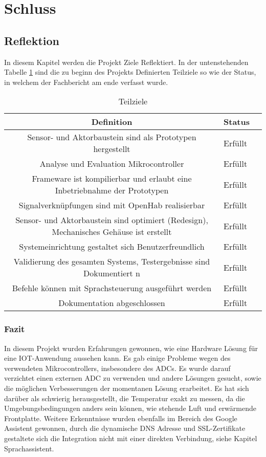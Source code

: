 \section{Schluss}

\subsection{Reflektion}

In diesem Kapitel werden die Projekt Ziele Reflektiert. In der untenstehenden Tabelle \ref{tab: Teilziele} sind die zu beginn des Projekts Definierten Teilziele so wie der Status, in welchem der Fachbericht am ende verfasst wurde.
\begin{table}[h!]
	\small
	\begin{tabular}{|c|l|c|}
		\hline 
		Definition & Status \\ 
		\hline 
		Sensor- und Aktorbaustein sind als Prototypen hergestellt& Erfüllt \\ 
		\hline 
		Analyse und Evaluation Mikrocontroller & Erfüllt \\ 
		\hline 
		Frameware ist kompilierbar und erlaubt eine Inbetriebnahme der Prototypen & Erfüllt \\ 
		\hline 
		Signalverknüpfungen sind mit OpenHab realisierbar & Erfüllt \\ 
		\hline 
		Sensor- und Aktorbaustein sind optimiert (Redesign), Mechanisches Gehäuse ist erstellt  & Erfüllt \\ 
		\hline 
		Systemeinrichtung gestaltet sich Benutzerfreundlich & Erfüllt \\ 
		\hline 
		Validierung des gesamten Systems, Testergebnisse sind Dokumentiert n & Erfüllt \\ 
		\hline 
		Befehle können mit Sprachsteuerung ausgeführt werden & Erfüllt \\ 
		\hline 
		Dokumentation abgeschlossen & Erfüllt \\ 
		\hline 
		\end{tabular}
	\caption{Teilziele}
	\label{tab: Teilziele}	 
\end{table}



\subsubsection{Fazit}
 In diesem Projekt wurden Erfahrungen gewonnen, wie eine Hardware Lösung für eine IOT-Anwendung aussehen kann. Es gab einige Probleme wegen des verwendeten Mikrocontrollers, insbesondere des ADCs. Es wurde darauf verzichtet einen externen ADC zu verwenden und andere Lösungen gesucht, sowie die möglichen Verbesserungen der momentanen Lösung erarbeitet. Es hat sich darüber als schwierig herausgestellt, die Temperatur exakt zu messen, da die Umgebungsbedingungen anders sein können, wie stehende Luft und erwärmende Frontplatte. Weitere Erkenntnisse wurden ebenfalls im Bereich des Google Assistent gewonnen, durch die dynamische DNS Adresse  und SSL-Zertifikate gestaltete sich die Integration nicht mit einer direkten Verbindung, siehe Kapitel Sprachassistent.


